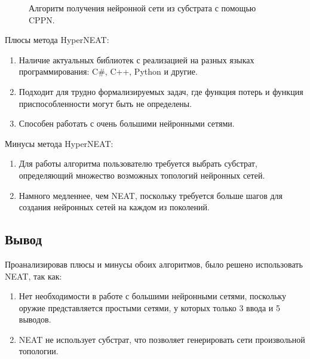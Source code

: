 \begin{figure}[ht]
    \begin{center}

        \caption{
            \label{substrat}
            Алгоритм получения нейронной сети из субстрата с помощью CPPN.}
    \end {center}
\end {figure}


{\parindent0pt Плюсы метода HyperNEAT:}
\begin{enumerate}[--]
    \item Наличие актуальных библиотек с реализацией на разных языках программирования: C\#, C++, Python и другие.
    \item Подходит для трудно формализируемых задач, где функция потерь и функция приспособленности могут быть не определены.
    \item Способен работать с очень большими нейронными сетями.
\end{enumerate}
%
Минусы метода HyperNEAT:
\begin{enumerate}[--]
    \item Для работы алгоритма пользователю требуется выбрать субстрат, определяющий множество возможных топологий нейронных сетей. 
    \item Намного медленнее, чем NEAT, поскольку требуется больше шагов для создания нейронных сетей на каждом из поколений.
\end{enumerate}


\subsection{Вывод}
Проанализировав плюсы и минусы обоих алгоритмов, было решено использовать NEAT, так как:

\begin{enumerate}[label=\textbullet]
    \item Нет необходимости в работе с большими нейронными сетями, поскольку оружие представляется простыми сетями, у которых только 3 ввода и 5 выводов.
    \item NEAT не использует субстрат, что позволяет генерировать сети произвольной топологии.
\end{enumerate}








